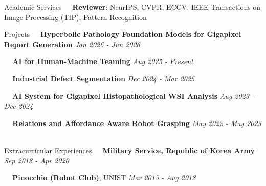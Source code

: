 \documentclass{resume} %
\begin{document}
\begin{rSection}{Academic Services}
\textbullet~\,\, {\bf Reviewer}: NeurIPS, CVPR, ECCV, IEEE Transactions on Image Processing (TIP), Pattern Recognition \\
\end{rSection}






\begin{rSection}{Projects}
\textbullet~\,\, {\bf Hyperbolic Pathology Foundation Models for Gigapixel Report Generation} \hfill {\it Jan 2026 - Jun 2026}
\\\hspace*{1.5em}{AI Computing Resource (GPU) Support Program, MSIT \& NIPA, Republic of Korea}

\textbullet~\,\, {\bf AI for Human-Machine Teaming} \hfill {\it Aug 2025 - Present}
\\\hspace*{1.5em}{United States Air Force \& IITP, Republic of Korea}

\textbullet~\,\, {\bf Industrial Defect Segmentation} \hfill {\it Dec 2024 - Mar 2025}
\\\hspace*{1.5em}{Samsung Device Solution (DS)}


\textbullet~\,\, {\bf AI System for Gigapixel Histopathological WSI Analysis} \hfill {\it Aug 2023 - Dec 2024}
\\\hspace*{1.5em}{Ministry of Health and Welfare, Republic of Korea}


\textbullet~\,\, {\bf Relations and Affordance Aware Robot Grasping} \hfill {\it May 2022 - May 2023}
\\\hspace*{1.5em}{Samsung Research, Republic of Korea} \\
\end{rSection}









\begin{rSection}{Extracurricular Experiences}
\textbullet~\,\, 
{\bf Military Service, Republic of Korea Army} \hfill {\it Sep 2018 - Apr 2020}
\\ \hspace*{1.5em}{Discharged as Sergeant}

\textbullet~\,\, 
{\bf Pinocchio (Robot Club)}{, UNIST} \hfill {\it Mar 2015 - Aug 2018}
\\ \hspace*{1.5em}{Education Director} 
\end{rSection}
\end{document}
